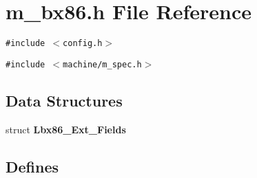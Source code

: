 \section{m\_\-bx86.h File Reference}
\label{m__bx86_8h}
{\tt \#include $<$config.h$>$}\par
{\tt \#include $<$machine/m\_\-spec.h$>$}\par
\subsection*{Data Structures}
\begin{CompactItemize}
\item 
struct \bf{Lbx86\_\-Ext\_\-Fields}
\end{CompactItemize}
\subsection*{Defines}
